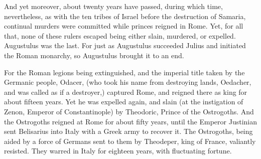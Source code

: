 And yet moreover, about twenty years have passed, during which time, nevertheless, as with the ten tribes of Israel before the destruction of Samaria, continual murders were committed while princes reigned in Rome. Yet, for all that, none of these rulers escaped being either slain, murdered, or expelled. Augustulus was the last. For just as Augustulus succeeded Julius and initiated the Roman monarchy, so Augustulus brought it to an end.

For the Roman legions being extinguished, and the imperial title taken by the Germanic people, Odacer, (who took his name from destroying lands, Oedacher, and was called as if a destroyer,) captured Rome, and reigned there as king for about fifteen years. Yet he was expelled again, and slain (at the instigation of Zenon, Emperor of Constantinople) by Theodoric, Prince of the Ostrogoths. And the Ostrogoths reigned at Rome for about fifty years, until the Emperor Justinian sent Belisarius into Italy with a Greek army to recover it. The Ostrogoths, being aided by a force of Germans sent to them by Theodeper, king of France, valiantly resisted. They warred in Italy for eighteen years, with fluctuating fortune.

